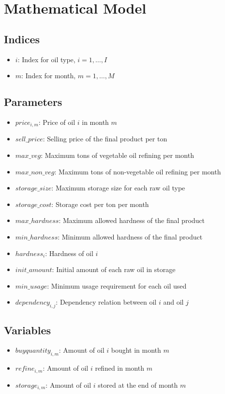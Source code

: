 \documentclass{article}
\begin{document}
\section*{Mathematical Model}

\subsection*{Indices}
\begin{itemize}
    \item $i$: Index for oil type, $i = 1, \ldots, I$
    \item $m$: Index for month, $m = 1, \ldots, M$
\end{itemize}

\subsection*{Parameters}
\begin{itemize}
    \item $price_{i,m}$: Price of oil $i$ in month $m$
    \item $sell\_price$: Selling price of the final product per ton
    \item $max\_veg$: Maximum tons of vegetable oil refining per month
    \item $max\_non\_veg$: Maximum tons of non-vegetable oil refining per month
    \item $storage\_size$: Maximum storage size for each raw oil type
    \item $storage\_cost$: Storage cost per ton per month
    \item $max\_hardness$: Maximum allowed hardness of the final product
    \item $min\_hardness$: Minimum allowed hardness of the final product
    \item $hardness_i$: Hardness of oil $i$
    \item $init\_amount$: Initial amount of each raw oil in storage
    \item $min\_usage$: Minimum usage requirement for each oil used
    \item $dependency_{i,j}$: Dependency relation between oil $i$ and oil $j$
\end{itemize}

\subsection*{Variables}
\begin{itemize}
    \item $buyquantity_{i,m}$: Amount of oil $i$ bought in month $m$
    \item $refine_{i,m}$: Amount of oil $i$ refined in month $m$
    \item $storage_{i,m}$: Amount of oil $i$ stored at the end of month $m$
\end{itemize}
\end{document}
